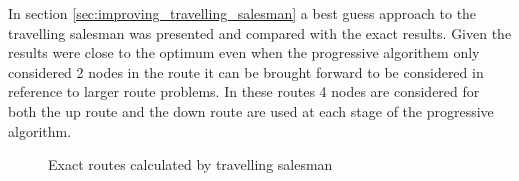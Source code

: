 \documentclass[a4paper,12pt,twoside]{article}
\begin{document}
In section \ref{sec:improving_travelling_salesman} a best guess approach to the travelling salesman was presented and compared with the exact results. Given the results were close to the optimum even when the progressive algorithem only considered 2 nodes in the route it can be brought forward to be considered in reference to larger route problems. In these routes 4 nodes are considered for both the up route and the down route are used at each stage of the progressive algorithm.

\begin{figure}[H]
	\centering
	
	\caption{Exact routes calculated by travelling salesman}
	\label{fig:exact_routes_calculated_by_travelling_salesman}
\end{figure}
\end{document}
